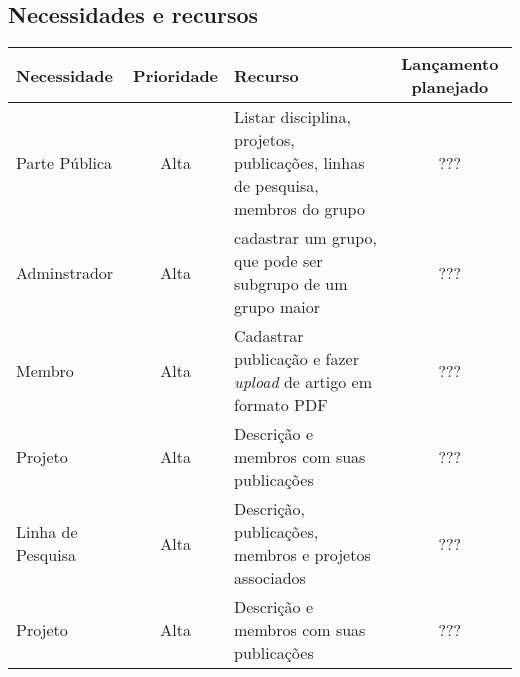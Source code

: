 \documentclass[11pt, a4paper]{article}
\begin{document}
        \subsection{Necessidades e recursos}
            \begin{tabular}{| l | c | p{5cm} | c |}
                \hline
                Necessidade & Prioridade & Recurso & Lançamento planejado \\ \hline
                Parte Pública & Alta & Listar disciplina, projetos, publicações, linhas de pesquisa, membros do grupo & ???\\ \hline
                Adminstrador & Alta & cadastrar um grupo, que 
                pode ser subgrupo de um grupo maior & ???\\ \hline
                Membro & Alta & Cadastrar publicação e fazer 
                \emph{upload} de artigo em formato PDF & ???\\ \hline
                Projeto & Alta & Descrição e membros com suas 
                publicações & ???\\ \hline
                Linha de Pesquisa & Alta & Descrição, publicações, 
                membros e projetos associados & ???\\ \hline
                Projeto & Alta & Descrição e membros com suas 
                publicações & ???\\ \hline
                \hline
            \end{tabular}
                
            


    
\end{document}
